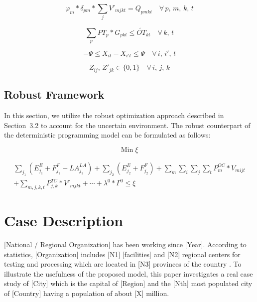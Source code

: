 \documentclass[10pt,twocolumn]{article}
\begin{document}
\begin{equation}
\varphi_m * \delta_{pm} * \sum_j V'_{mjkt} = Q_{pmkt}
  \quad \forall\, p,\, m,\, k,\, t
\label{eq:c7}
\end{equation}

\begin{equation}
\sum_p PT_p * G_{pkt} \le \widetilde{OT}_{kt} \quad \forall\, k,\, t
\label{eq:c8}
\end{equation}

\begin{equation}
- \Psi \le X_{it} - X_{i't} \le \Psi \quad \forall\, i,\, i',\, t
\label{eq:c9}
\end{equation}

\begin{equation}
Z_{ij},\, Z'_{jk} \in \{0,1\} \quad \forall\, i,\, j,\, k
\label{eq:bin}
\end{equation}

\subsection{Robust Framework}

In this section, we utilize the robust optimization approach
described in Section~3.2 to account for the uncertain environment.
The robust counterpart of the deterministic programming model can be
formulated as follows:

\begin{equation}
\text{Min}\; \xi
\label{eq:robobj}
\end{equation}

\begin{multline}
\sum_{j_1}\left(E^E_{j_1} + F^F_{j_1} + LA^{LA}_{j_1}\right)
  + \sum_{j_2}\left(E^E_{j_2} + F^F_{j_2}\right)
  + \sum_m \sum_i \sum_j \sum_t P^{OC}_m * V_{mijt}\\
  + \sum_{m,j,k,t} P^{TC}_{j,k} * V'_{mjkt}
  + \cdots
  + \lambda^0 * \Gamma^0 \le \xi
\label{eq:robust_full}
\end{multline}

\section{Case Description}

[National / Regional Organization] has been working since [Year].
According to statistics, [Organization] includes [N1] [facilities]
and [N2] regional centers for testing and processing which are
located in [N3] provinces of the country \cite{Abolghasemi2009}.
To illustrate the usefulness of the proposed model, this paper
investigates a real case study of [City] which is the capital of
[Region] and the [Nth] most populated city of [Country] having a
population of about [X] million.
\end{document}
